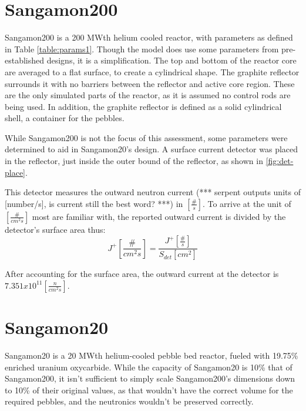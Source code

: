 
%
%
%


\section{Sangamon200}
Sangamon200 is a 200 MWth helium cooled reactor, with parameters as defined in Table \ref{table:params1}.  Though the model does use some parameters from pre-established designs, it is a simplification.  The top and bottom of the reactor core are averaged to a flat surface, to create a cylindrical shape.  The graphite reflector surrounds it with no barriers between the reflector and active core region. These are the only simulated parts of the reactor, as it is assumed no control rods are being used.  In addition, the graphite reflector is defined as a solid cylindrical shell, a container for the pebbles.

While Sangamon200 is not the focus of this assessment, some parameters were determined to aid in Sangamon20's design.  A surface current detector was placed in the reflector, just inside the outer bound of the reflector, as shown in \ref{fig:det-place}.



This detector measures the outward neutron current (*** serpent outputs units of [number/s], is current still the best word? ***) in $\left[\frac{\#}{s}\right]$.  To arrive at the unit of $\left[\frac{\#}{cm^2s}\right]$ most are familiar with, the reported outward current is divided by the detector's surface area thus:
\begin{equation}
J^+ \left[\frac{\#}{cm^2s}\right] = \frac{J^+ \left[\frac{\#}{s}\right]}{S_{det}\left[cm^2\right]}
\end{equation}

After accounting for the surface area, the outward current at the detector is $7.351x10^{11} \left[\frac{n}{cm^{2}s}\right]$.

\section{Sangamon20}

Sangamon20 is a 20 MWth helium-cooled pebble bed reactor, fueled with 19.75\% enriched uranium oxycarbide.  While the capacity of Sangamon20 is 10\% that of Sangamon200, it isn't sufficient to simply scale Sangamon200's dimensions down to 10\% of their original values, as that wouldn't have the correct volume for the required pebbles, and the neutronics wouldn't be preserved correctly.

